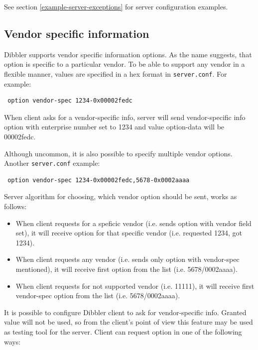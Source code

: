 See section \ref{example-server-exceptions} for server configuration examples.

\subsection{Vendor specific information}
Dibbler supports vendor specific information options. As the name
suggests, that option is specific to a particular vendor. To be able
to support any vendor in a flexible manner, values are specified in a
hex format in \verb+server.conf+. For example:

\begin{lstlisting}
 option vendor-spec 1234-0x00002fedc
\end{lstlisting}

When client asks for a vendor-specific info, server will send
vendor-specific info option with enterprise number set to 1234 and
value option-data will be 00002fedc.

Although uncommon, it is also possible to specify multiple vendor
options. Another \verb+server.conf+ example:

\begin{lstlisting}
 option vendor-spec 1234-0x00002fedc,5678-0x0002aaaa
\end{lstlisting}

Server algorithm for choosing, which vendor option should be sent,
works as follows:

\begin{itemize}
\item When client requests for a speficic vendor (i.e. sends
   option with vendor field set), it will
  receive option for that specific vendor (i.e. requested 1234, got 1234).
 \item When client requests any vendor (i.e. sends only  option
   with vendor-spec mentioned), it will receive first  option from the list (i.e. 5678/0002aaaa).
 \item When client requests for not supported vendor (i.e. 11111), it will    
   receive first vendor-spec option from the list
   (i.e. 5678/0002aaaa).
\end{itemize}

It is possible to configure Dibbler client to ask for vendor-specific
info. Granted value will not be used, so from the client's point of
view this feature may be used as testing tool for the server. Client
can request  option in one of the following ways:

